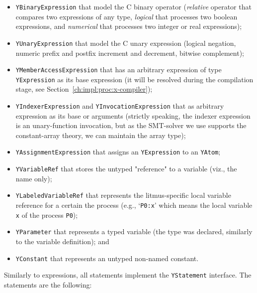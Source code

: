 \begin{itemize}%
  \item \texttt{YBinaryExpression} that model the C binary operator (\textit{relative} operator that compares two expressions of any type, \textit{logical} that processes two boolean expressions, and \textit{numerical} that processes two integer or real expressions);

  \item \texttt{YUnaryExpression} that model the C unary expression (logical negation, numeric prefix and postfix increment and decrement, bitwise complement);

  \item \texttt{YMemberAccessExpression} that has an arbitrary expression of type \texttt{YExpression} as its base expression (it will be resolved during the compilation stage, see Section~\ref{ch:impl:proc:x-compiler});

  \item \texttt{YIndexerExpression} and \texttt{YInvocationExpression} that as arbitrary expression as its base or arguments (strictly speaking, the indexer expression is an unary-function invocation, but as the SMT-solver we use supports the constant-array theory, we can maintain the array type);

  \item \texttt{YAssignmentExpression} that assigns an \texttt{YExpression} to an \texttt{YAtom};

  \item \texttt{YVariableRef} that stores the untyped "reference" to a variable (viz., the name only);

  \item \texttt{YLabeledVariableRef} that represents the litmus-specific local variable reference for a certain the process (e.g., `\lstinline{P0:x}' which means the local variable \lstinline{x} of the process \lstinline{P0});

  \item \texttt{YParameter} that represents a typed variable (the type was declared, similarly to the variable definition); and

  \item \texttt{YConstant} that represents an untyped non-named constant.
\end{itemize}

Similarly to expressions, all \ytree{} statements implement the \texttt{YStatement} interface. The statements are the following: 

